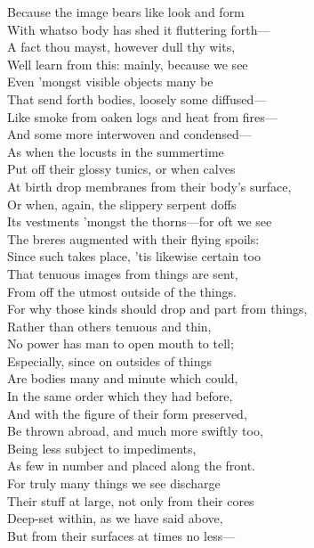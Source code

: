 Because the image bears like look and form\\
With whatso body has shed it fluttering forth—\\
A fact thou mayst, however dull thy wits,\\
Well learn from this: mainly, because we see\\
Even 'mongst visible objects many be\\
That send forth bodies, loosely some diffused—\\
Like smoke from oaken logs and heat from fires—\\
And some more interwoven and condensed—\\
As when the locusts in the summertime\\
Put off their glossy tunics, or when calves\\
At birth drop membranes from their body's surface,\\
Or when, again, the slippery serpent doffs\\
Its vestments 'mongst the thorns—for oft we see\\
The breres augmented with their flying spoils:\\
Since such takes place, 'tis likewise certain too\\
That tenuous images from things are sent,\\
From off the utmost outside of the things.\\
For why those kinds should drop and part from things,\\
Rather than others tenuous and thin,\\
No power has man to open mouth to tell;\\
Especially, since on outsides of things\\
Are bodies many and minute which could,\\
In the same order which they had before,\\
And with the figure of their form preserved,\\
Be thrown abroad, and much more swiftly too,\\
Being less subject to impediments,\\
As few in number and placed along the front.\\
For truly many things we see discharge\\
Their stuff at large, not only from their cores\\
Deep-set within, as we have said above,\\
But from their surfaces at times no less—\\
